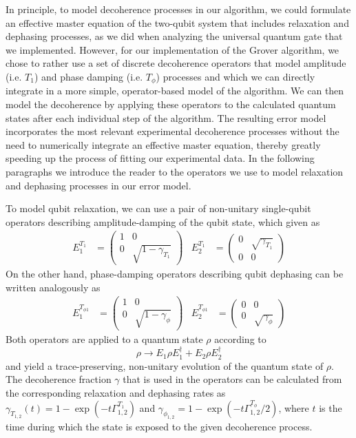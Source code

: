 In principle, to model decoherence processes in our algorithm, we could formulate an effective master equation of the two-qubit system that includes relaxation and dephasing processes, as we did when analyzing the universal quantum gate that we implemented. However, for our implementation of the Grover algorithm, we chose to rather use a set of discrete decoherence operators that model amplitude (i.e. $T_1$) and phase damping (i.e. $T_\phi$) processes and which we can directly integrate in a more simple, operator-based model of the algorithm. We can then model the decoherence by applying these operators to the calculated quantum states after each individual step of the algorithm. The resulting error model incorporates the most relevant experimental decoherence processes without the need to numerically integrate an effective master equation, thereby greatly speeding up the process of fitting our experimental data. In the following paragraphs we introduce the reader to the operators we use to model relaxation and dephasing processes in our error model.

\smallskip

To model qubit relaxation, we can use a pair of non-unitary single-qubit operators describing amplitude-damping of the qubit state, which given as \citep{nielsen_quantum_2000}
%
\begin{align}
 E_1^{T_1} & = \left(\begin{array}{cc} 1 & 0 \\ 0 & \sqrt{1-\gamma_{T_1}} \end{array}\right)   &  E_2^{T_1}  & = \left( \begin{array}{cc} 0 & \sqrt{\gamma_{T_1}} \\ 0 & 0 \end{array} \right) \label{eq:grover_energy_relaxation}
\end{align}
%
On the other hand, phase-damping operators describing qubit dephasing can be written analogously as
%
\begin{align}
 E_1^{T_{\phi 1}} & = \left(\begin{array}{cc} 1 & 0 \\ 0 & \sqrt{1-\gamma_\phi} \end{array}\right)   &  E_2^{T_{\phi 1}}  & = \left( \begin{array}{cc} 0 & 0 \\ 0 & \sqrt{\gamma_\phi}  \end{array} \right) \label{eq:grover_phase_decoherence}
\end{align}
%
Both operators are applied to a quantum state $\rho$ according to
%
\begin{equation}
\rho \to E_1 \rho E_1^\dagger+E_2 \rho E_2^\dagger
\end{equation}
%
and yield a trace-preserving, non-unitary evolution of the quantum state of $\rho$. The decoherence fraction $\gamma$ that is used in the operators can be calculated from the corresponding relaxation and dephasing rates as $\gamma_{T_{1,2}}(t) = 1-\exp{\left(-t \Gamma_{1,2}^{T_1}\right)}$ and $\gamma_{\phi_{1,2}} = 1-\exp{\left(-t \Gamma_{1,2}^{T_\phi}/2\right)}$, where $t$ is the time during which the state is exposed to the given decoherence process.

